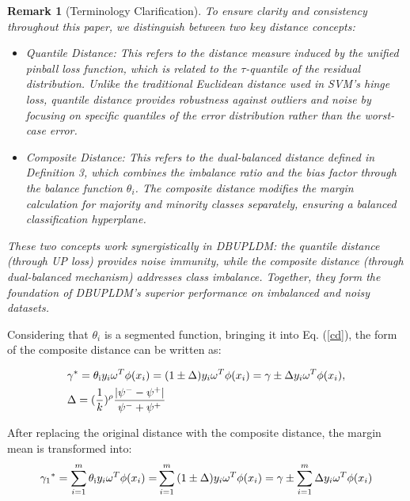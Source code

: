 \documentclass[a4paper]{cas-sc}
\newtheorem{remark}{Remark}
\begin{document}
{\color{magenta}
\begin{remark}[Terminology Clarification]
To ensure clarity and consistency throughout this paper, we distinguish between two key distance concepts:
\begin{itemize}
    \item \textit{Quantile Distance}: This refers to the distance measure induced by the unified pinball loss function, which is related to the $\tau$-quantile of the residual distribution. Unlike the traditional Euclidean distance used in SVM's hinge loss, quantile distance provides robustness against outliers and noise by focusing on specific quantiles of the error distribution rather than the worst-case error.
    \item \textit{Composite Distance}: This refers to the dual-balanced distance defined in Definition 3, which combines the imbalance ratio and the bias factor through the balance function $\theta_i$. The composite distance modifies the margin calculation for majority and minority classes separately, ensuring a balanced classification hyperplane.
\end{itemize}
These two concepts work synergistically in DBUPLDM: the quantile distance (through UP loss) provides noise immunity, while the composite distance (through dual-balanced mechanism) addresses class imbalance. Together, they form the foundation of DBUPLDM's superior performance on imbalanced and noisy datasets.
\end{remark}
}



Considering that $\theta_{i}$ is a segmented function, bringing it into Eq. (\ref{cd}), the form of the composite distance can be written as:

\begin{equation}
\begin{aligned}
& {\gamma ^*} = {\theta _{\rm{i}}}{y_i}{\omega ^T}\phi ({x_i}) = (1 \pm {\Delta}){y_i}{\omega ^T}\phi ({x_i}) = \gamma  \pm {\Delta}{y_i}{\omega ^T}\phi ({x_i}),\\
& {\Delta} = (\frac{1}{k})^{\rho}\frac{{\left| {{\psi ^ - } - {\psi ^ + }} \right|}}{{{\psi ^ - } + {\psi ^ + }}}
\end{aligned}
\end{equation}

After replacing the original distance with the composite distance, the margin mean is transformed into:
\begin{equation}
{\gamma _1}^* = \sum\limits_{i = 1}^m {{\theta _{\rm{i}}}{y_i}{\omega ^T}\phi ({x_i}) = } \sum\limits_{i = 1}^m {(1 \pm {\Delta}){y_i}{\omega ^T}\phi ({x_i})}  = \gamma  \pm \sum\limits_{i = 1}^m {{\Delta}{y_i}{\omega ^T}\phi ({x_i})} 
\end{equation}
\end{document}
